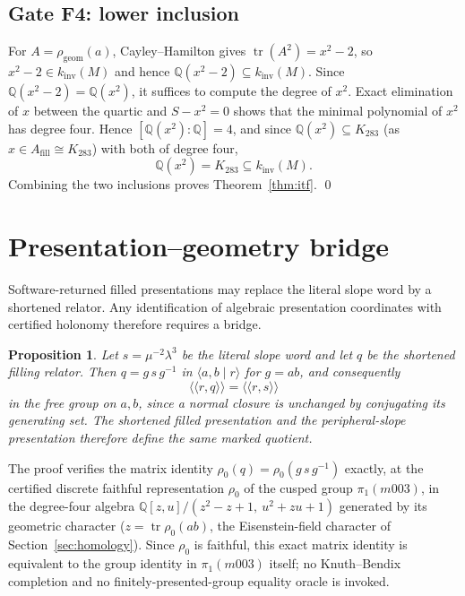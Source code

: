 \documentclass[11pt,a4paper]{article}
\newtheorem{proposition}[theorem]{Proposition}
\theoremstyle{definition}
\theoremstyle{remark}
\newcommand{\tr}{\operatorname{tr}}
\newcommand{\kinv}{k_{\mathrm{inv}}}
\newcommand{\Q}{\mathbb{Q}}
\begin{document}
\subsection{Gate F4: lower inclusion}

For $A = \rho_{\mathrm{geom}}(a)$, Cayley--Hamilton gives
$\tr(A^2) = x^2 - 2$, so $x^2 - 2 \in \kinv(M)$ and hence
$\Q(x^2-2) \subseteq \kinv(M)$. Since $\Q(x^2-2) = \Q(x^2)$, it suffices
to compute the degree of $x^2$. Exact elimination of
$x$ between the quartic and $S - x^2 = 0$ shows that the minimal
polynomial of $x^2$ has degree four. Hence
$[\Q(x^2):\Q] = 4$, and since $\Q(x^2) \subseteq K_{283}$ (as $x \in A_{\mathrm{fill}} \cong K_{283}$) with both of
degree four,
\begin{equation}
\Q(x^2) = K_{283} \subseteq \kinv(M).
\end{equation}
Combining the two inclusions proves Theorem~\ref{thm:itf}. \qed

\section{Presentation--geometry bridge}
\label{sec:bridge}

Software-returned filled presentations may replace the literal slope
word by a shortened relator. Any identification of algebraic
presentation coordinates with certified holonomy therefore requires a
bridge.

\begin{proposition}
\label{prop:bridge}
Let $s = \mu^{-2}\lambda^{3}$ be the literal slope word and let $q$ be
the shortened filling relator. Then $q = g\,s\,g^{-1}$ in
$\langle a,b \mid r\rangle$ for $g = ab$, and consequently
\begin{equation}
\langle\langle r, q \rangle\rangle
= \langle\langle r, s \rangle\rangle
\end{equation}
in the free group on $a,b$, since a normal closure is unchanged by
conjugating its generating set. The shortened filled presentation and
the peripheral-slope presentation therefore define the same marked
quotient.
\end{proposition}

The proof verifies the matrix identity $\rho_0(q) = \rho_0(g\,s\,g^{-1})$
exactly, at the certified discrete faithful representation $\rho_0$ of
the cusped group $\pi_1(m003)$, in the degree-four algebra
$\Q[z,u]/(z^2-z+1,\ u^2+zu+1)$ generated by its geometric character
($z = \tr\rho_0(ab)$, the Eisenstein-field character of
Section~\ref{sec:homology}). Since $\rho_0$ is faithful, this exact
matrix identity is equivalent to the group identity in $\pi_1(m003)$
itself; no Knuth--Bendix completion and no finitely-presented-group
equality oracle is invoked.
\end{document}
